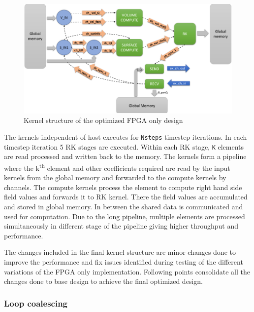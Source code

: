 \begin{figure}[ht]%
    \centering
    \includegraphics[width=1.0\textwidth]{images/fpgaonly_kernstruc}
    \caption{Kernel structure of the optimized FPGA only design}
    \label{fig:fpgaonly_kernstruc}
\end{figure}

The kernels independent of host executes for \texttt{Nsteps} timestep iterations.
In each timestep iteration 5 RK stages are executed. Within each RK stage, \texttt{K}
elements are read processed and written back to the memory. The kernels form a pipeline
where the k\textsuperscript{th} element and other coefficients required are read by the
input kernels from the global memory and forwarded to the compute kernels by channels.
The compute kernels process the element to compute right hand side field values and
forwards it to RK kernel. There the field values are accumulated and stored in global memory.
In between the shared data is communicated and used for computation. Due to the long pipeline,
multiple elements are processed simultaneously in different stage of the pipeline giving
higher throughput and performance.

The changes included in the final kernel structure are minor changes done to improve the performance
and fix issues identified during testing of the different variations of the FPGA only implementation.
Following points consolidate all the changes done to base design to achieve the final optimized
design.

\subsubsection*{Loop coalescing}

